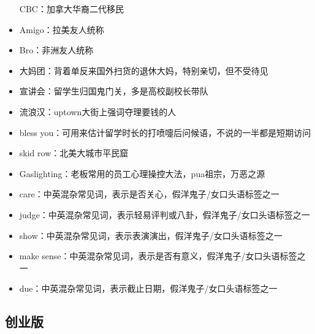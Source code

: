 \documentclass[]{tufte-book}
\begin{document}
\begin{itemize}
  CBC：加拿大华裔二代移民
\item
  Amigo：拉美友人统称
\item
  Bro：非洲友人统称
\item
  大妈团：背着单反来国外扫货的退休大妈，特别亲切，但不受待见
\item
  宣讲会：留学生归国鬼门关，多是高校副校长带队
\item
  流浪汉：uptown大街上强词夺理要钱的人
\item
  bless you：可用来估计留学时长的打喷嚏后问候语，不说的一半都是短期访问
\item
  skid row：北美大城市平民窟
\item
  Gaslighting：老板常用的员工心理操控大法，pua祖宗，万恶之源
\item
  care：中英混杂常见词，表示是否关心，假洋鬼子/女口头语标签之一
\item
  judge：中英混杂常见词，表示轻易评判或八卦，假洋鬼子/女口头语标签之一
\item
  show：中英混杂常见词，表示表演演出，假洋鬼子/女口头语标签之一
\item
  make sense：中英混杂常见词，表示是否有意义，假洋鬼子/女口头语标签之一
\item
  due：中英混杂常见词，表示截止日期，假洋鬼子/女口头语标签之一
\end{itemize}

\hypertarget{ux521bux4e1aux7248}{%
\subsection*{创业版}\label{ux521bux4e1aux7248}}
\end{document}
